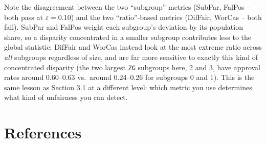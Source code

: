 \documentclass[11pt]{article}
\begin{document}
Note the disagreement between the two ``subgroup'' metrics (SubPar, FalPos --
both pass at $\varepsilon=0.10$) and the two ``ratio''-based metrics
(DifFair, WorCas -- both fail). SubPar and FalPos weight each subgroup's
deviation by its population share, so a disparity concentrated in a smaller
subgroup contributes less to the global statistic; DifFair and WorCas instead
look at the most extreme ratio across \emph{all} subgroups regardless of
size, and are far more sensitive to exactly this kind of concentrated
disparity (the two largest \texttt{ZG} subgroups here, 2 and 3, have approval
rates around 0.60--0.63 vs.\ around 0.24--0.26 for subgroups 0 and 1). This is
the same lesson as Section 3.1 at a different level: which metric you use
determines what kind of unfairness you can detect.

\section{References}
\label{sec:refs}
\end{document}
